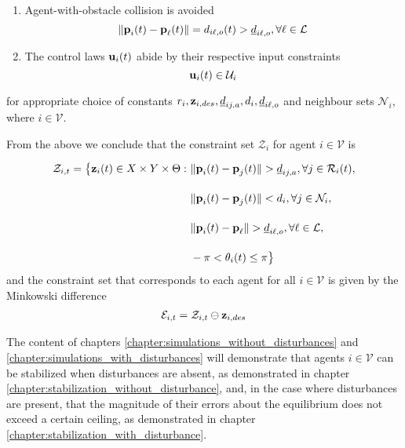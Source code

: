 \begin{problem}
\begin{enumerate}
  \item Agent-with-obstacle collision is avoided
    $$ \|\bm{\mathbf{p}}_i(t) - \bm{\mathbf{p}}_{\ell}(t)\| = d_{i\ell,o} (t) > \underline{d}_{i\ell,o},
    \forall \ell \in \mathcal{L}$$

  \item The control laws $\bm{\mathbf{u}}_i(t)$ abide by their respective input constraints
    $$\bm{\mathbf{u}}_i(t) \in \mathcal{U}_i$$
\end{enumerate}

for appropriate choice of constants
$r_i,\bm{\mathbf{z}}_{i,des},\underline{d}_{ij,a}, d_i,\underline{d}_{i\ell,o}$ and
neighbour sets $\mathcal{N}_i$, where $i \in \mathcal{V}$.
\end{problem}

From the above we conclude that the constraint set $\mathcal{Z}_i$ for
agent $i \in \mathcal{V}$ is

\begin{align}
  \mathcal{Z}_{i,t} = \big\{\bm{\mathbf{z}}_i(t) \in X \times Y \times \Theta : \
      & \|\bm{\mathbf{p}}_i(t) - \bm{\mathbf{p}}_j(t)\| > \underline{d}_{ij,a}, \forall j \in \mathcal{R}_i(t), \\[2.5ex]
      & \|\bm{\mathbf{p}}_i(t) - \bm{\mathbf{p}}_j(t)\| < d_i, \forall j \in \mathcal{N}_i, \\[2.5ex]
      & \|\bm{\mathbf{p}}_i(t) - \bm{\mathbf{p}}_{\ell}\| > \underline{d}_{i\ell,o}, \forall \ell \in \mathcal{L}, \\[2.5ex]
      & - \pi < \theta_i(t) \leq \pi \big\}
\end{align}
and the constraint set that corresponds to each agent for all
$i \in \mathcal{V}$  is given by the Minkowski difference
\begin{align}
  \mathcal{E}_{i,t} = \mathcal{Z}_{i,t} \ominus \bm{\mathbf{z}}_{i,des}
  \label{eq:error_constraint_set_unicycle}
\end{align}

The content of chapters \ref{chapter:simulations_without_disturbances} and
\ref{chapter:simulations_with_disturbances} will demonstrate that agents
$i \in \mathcal{V}$ can be stabilized when disturbances are absent, as
demonstrated in chapter \ref{chapter:stabilization_without_disturbance}, and,
in the case where disturbances are present, that the magnitude of their errors
about the equilibrium does not exceed a certain ceiling, as demonstrated in
chapter \ref{chapter:stabilization_with_disturbance}.
